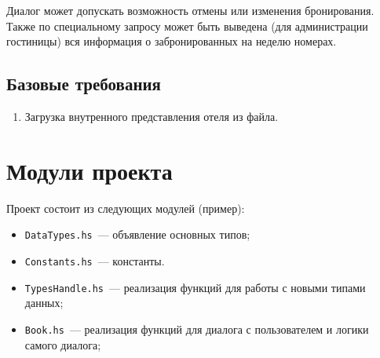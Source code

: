 \documentclass[oneside,final,14pt]{extarticle}
\begin{document}
Диалог может допускать возможность отмены или изменения бронирования. Также по
специальному запросу может быть выведена (для администрации гостиницы) вся
информация о забронированных на неделю номерах.

\subsection{Базовые требования}

\begin{enumerate}
    \item Загрузка внутренного представления отеля из файла.
\end{enumerate}

\section{Модули проекта}

Проект состоит из следующих модулей (пример):
\begin{itemize}
    \item \texttt{DataTypes.hs}~--- объявление основных типов;
    \item \texttt{Constants.hs}~--- константы.
    \item \texttt{TypesHandle.hs}~--- реализация функций для работы с новыми типами данных;
    \item \texttt{Book.hs}~--- реализация функций для диалога с пользователем и логики самого диалога;

\end{itemize}
\end{document}
